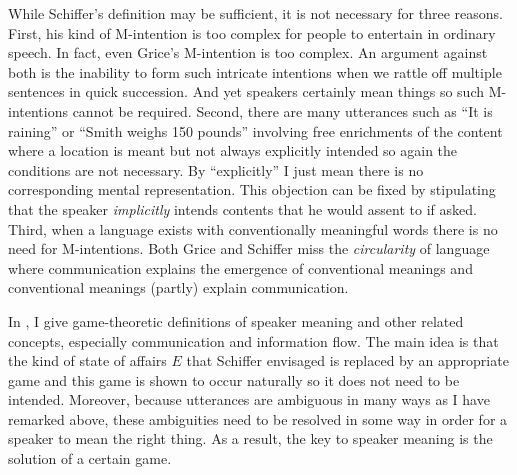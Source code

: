 While Schiffer's definition may be sufficient, it is not necessary for three reasons. First, his kind of M-intention is too complex for people to entertain in ordinary speech. In fact, even Grice's M-intention is too complex. An argument against both is the inability to form such intricate intentions when we rattle off multiple sentences in quick succession. And yet speakers certainly mean things so such M-intentions cannot be required. Second, there are many utterances such as ``It is raining'' or ``Smith weighs 150 pounds'' involving free enrichments of the content where a location is meant but not always explicitly intended so again the conditions are not necessary. By ``explicitly'' I just mean there is no corresponding mental representation. This objection can be fixed by stipulating that the speaker \emph{implicitly} intends contents that he would assent to if asked. Third, when a language exists with conventionally meaningful words there is no need for M-intentions. Both Grice and Schiffer miss the \emph{circularity} of language where communication explains the emergence of conventional meanings and conventional meanings (partly) explain communication. 

In \citet{parikh:cmi, parikh:ul, parikh:le}, I give game-theoretic definitions of speaker meaning and other related concepts, especially communication and information flow. The main idea is that the kind of state of affairs $E$ that Schiffer envisaged is replaced by an appropriate game and this game is shown to occur naturally  so it does not need to be intended. Moreover, because utterances are ambiguous in many ways as I have remarked above, these ambiguities need to be resolved in some way in order for a speaker to mean the right thing. As a result, the key to speaker meaning is the solution of a certain game.


